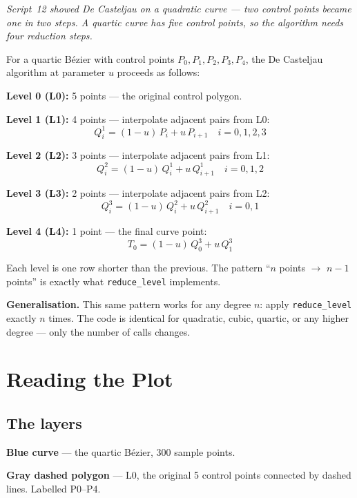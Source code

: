 \documentclass[12pt, a4paper]{article}
\newcommand{\cd}[1]{\texttt{#1}}
\begin{document}
\textit{Script~12 showed De Casteljau on a quadratic curve ---
two control points became one in two steps.
A quartic curve has five control points, so the algorithm
needs four reduction steps.}

For a quartic B\'ezier with control points
$P_0, P_1, P_2, P_3, P_4$, the De Casteljau algorithm
at parameter $u$ proceeds as follows:

\textbf{Level 0 (L0):} 5 points --- the original control polygon.

\textbf{Level 1 (L1):} 4 points --- interpolate adjacent pairs from L0:
\[
  Q^1_i = (1-u)\,P_i + u\,P_{i+1} \quad i = 0,1,2,3
\]

\textbf{Level 2 (L2):} 3 points --- interpolate adjacent pairs from L1:
\[
  Q^2_i = (1-u)\,Q^1_i + u\,Q^1_{i+1} \quad i = 0,1,2
\]

\textbf{Level 3 (L3):} 2 points --- interpolate adjacent pairs from L2:
\[
  Q^3_i = (1-u)\,Q^2_i + u\,Q^2_{i+1} \quad i = 0,1
\]

\textbf{Level 4 (L4):} 1 point --- the final curve point:
\[
  T_0 = (1-u)\,Q^3_0 + u\,Q^3_1
\]

Each level is one row shorter than the previous.
The pattern ``$n$ points $\to$ $n-1$ points'' is exactly
what \cd{reduce\_level} implements.

\begin{notebox}
\textbf{Generalisation.}
This same pattern works for any degree $n$: apply
\cd{reduce\_level} exactly $n$ times.
The code is identical for quadratic, cubic, quartic,
or any higher degree --- only the number of calls changes.
\end{notebox}


\section{Reading the Plot}

\subsection{The layers}

\textbf{Blue curve} --- the quartic B\'ezier, 300 sample points.

\textbf{Gray dashed polygon} --- L0, the original 5 control points
connected by dashed lines. Labelled P0--P4.
\end{document}
